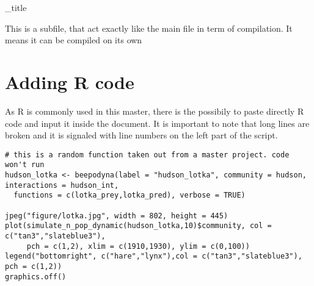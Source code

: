 \documentclass[../Master_report2.tex]{subfiles}
\begin{document}
\sub_title{}

This is a subfile, that act exactly like the main file in term of compilation. It means it can be compiled on its own

\section{Adding R code}

As R \citep{RTeam2017} is commonly used in this master, there is the possibily to paste directly R code and input it inside the document. It is important to note that long lines are broken and it is signaled with line numbers on the left part of the script.

\begin{lstlisting}
# this is a random function taken out from a master project. code won't run
hudson_lotka <- beepodyna(label = "hudson_lotka", community = hudson, interactions = hudson_int,
  functions = c(lotka_prey,lotka_pred), verbose = TRUE)

jpeg("figure/lotka.jpg", width = 802, height = 445)
plot(simulate_n_pop_dynamic(hudson_lotka,10)$community, col = c("tan3","slateblue3"),
     pch = c(1,2), xlim = c(1910,1930), ylim = c(0,100))
legend("bottomright", c("hare","lynx"),col = c("tan3","slateblue3"), pch = c(1,2))
graphics.off()
\end{lstlisting}

\nocite{RTeam2017}

\biblio
\end{document}
